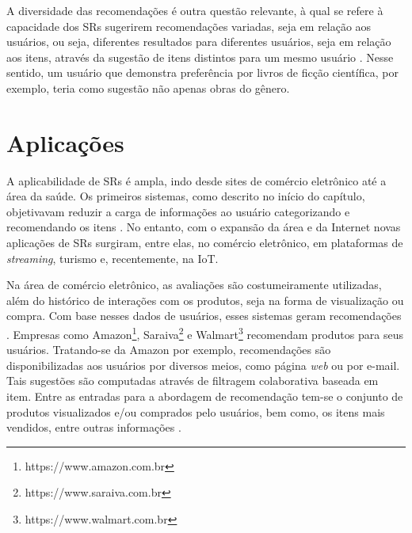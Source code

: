     A diversidade das recomendações é outra questão relevante, à qual se refere à capacidade dos SRs sugerirem recomendações variadas, seja em relação aos usuários, ou seja, diferentes resultados para diferentes usuários, seja em relação aos itens, através da sugestão de itens distintos para um mesmo usuário \cite{Lue2012}. Nesse sentido, um usuário que demonstra preferência por livros de ficção científica, por exemplo, teria como sugestão não apenas obras do gênero.

\section{Aplicações}


A aplicabilidade de SRs é ampla, indo desde sites de comércio eletrônico até a área da saúde. Os primeiros sistemas, como descrito no início do capítulo, objetivavam reduzir a carga de informações ao usuário categorizando e recomendando os itens \cite{Goldberg1992, Resnick1994}. No entanto, com o expansão da área e da Internet novas aplicações de SRs surgiram, entre elas, no comércio eletrônico, em plataformas de \textit{streaming}, turismo e, recentemente, na IoT. 

Na área de comércio eletrônico, as avaliações são costumeiramente utilizadas, além do histórico de interações com os produtos, seja na forma de visualização ou compra. Com base nesses dados de usuários, esses sistemas geram recomendações  \cite{Lu2015}. Empresas como Amazon\textsuperscript{\textregistered}\footnote{https://www.amazon.com.br}, Saraiva\textsuperscript{\textregistered}\footnote{https://www.saraiva.com.br} e Walmart\textsuperscript{\textregistered}\footnote{https://www.walmart.com.br} recomendam produtos para seus usuários. Tratando-se da Amazon por exemplo, recomendações são disponibilizadas aos usuários por diversos meios, como página \textit{web} ou por e-mail. Tais sugestões são computadas através de filtragem colaborativa baseada em item. Entre as entradas para a abordagem de recomendação tem-se o conjunto de produtos visualizados e/ou comprados pelo usuários, bem como, os itens mais vendidos, entre outras informações \cite{Krawiec2016}.



